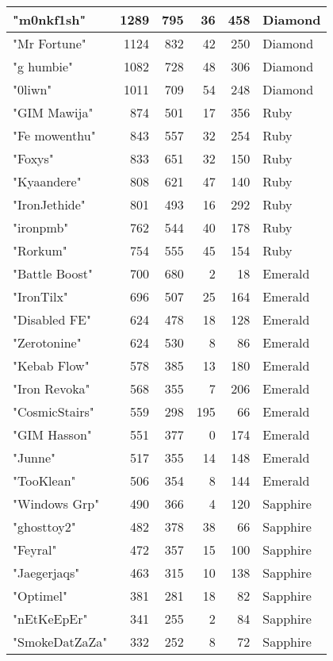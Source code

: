\documentclass{article}
\begin{document}
\begin{table}[htbp]
\begin{tabular}{|l|r|r|r|r|l|}
"m0nkf1sh" & 1289 & 795 & 36 & 458 & Diamond \\ \hline
"Mr Fortune" & 1124 & 832 & 42 & 250 & Diamond \\ \hline
"g humbie" & 1082 & 728 & 48 & 306 & Diamond \\ \hline
"0liwn" & 1011 & 709 & 54 & 248 & Diamond \\ \hline
"GIM Mawija" & 874 & 501 & 17 & 356 & Ruby \\ \hline
"Fe mowenthu" & 843 & 557 & 32 & 254 & Ruby \\ \hline
"Foxys" & 833 & 651 & 32 & 150 & Ruby \\ \hline
"Kyaandere" & 808 & 621 & 47 & 140 & Ruby \\ \hline
"IronJethide" & 801 & 493 & 16 & 292 & Ruby \\ \hline
"ironpmb" & 762 & 544 & 40 & 178 & Ruby \\ \hline
"Rorkum" & 754 & 555 & 45 & 154 & Ruby \\ \hline
"Battle Boost" & 700 & 680 & 2 & 18 & Emerald \\ \hline
"IronTilx" & 696 & 507 & 25 & 164 & Emerald \\ \hline
"Disabled FE" & 624 & 478 & 18 & 128 & Emerald \\ \hline
"Zerotonine" & 624 & 530 & 8 & 86 & Emerald \\ \hline
"Kebab Flow" & 578 & 385 & 13 & 180 & Emerald \\ \hline
"Iron Revoka" & 568 & 355 & 7 & 206 & Emerald \\ \hline
"CosmicStairs" & 559 & 298 & 195 & 66 & Emerald \\ \hline
"GIM Hasson" & 551 & 377 & 0 & 174 & Emerald \\ \hline
"Junne" & 517 & 355 & 14 & 148 & Emerald \\ \hline
"TooKlean" & 506 & 354 & 8 & 144 & Emerald \\ \hline
"Windows Grp" & 490 & 366 & 4 & 120 & Sapphire \\ \hline
"ghosttoy2" & 482 & 378 & 38 & 66 & Sapphire \\ \hline
"Feyral" & 472 & 357 & 15 & 100 & Sapphire \\ \hline
"Jaegerjaqs" & 463 & 315 & 10 & 138 & Sapphire \\ \hline
"Optimel" & 381 & 281 & 18 & 82 & Sapphire \\ \hline
"nEtKeEpEr" & 341 & 255 & 2 & 84 & Sapphire \\ \hline
"SmokeDatZaZa" & 332 & 252 & 8 & 72 & Sapphire \\ \hline

\end{tabular}
\end{table}
\end{document}
